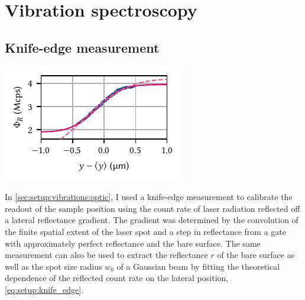 \chapter{Vibration spectroscopy}\label{ch:app:setup:vibrations}
\section{Knife-edge measurement}\label{sec:app:setup:vibrations:knife_edge}
\begin{marginfigure}
    \centering
    \includegraphics{img/pdf/setup/knife_edge_erf}
    \caption{}
    \label{fig:app:setup:vibrations:knife_edge}
\end{marginfigure}

In \cref{sec:setup:vibrations:optic}, I used a knife-edge measurement to calibrate the readout of the sample position using the count rate of laser radiation reflected off a lateral reflectance gradient.
The gradient was determined by the convolution of the finite spatial extent of the laser spot and a step in reflectance from a  gate with approximately perfect reflectance and the bare  surface.
The same measurement can also be used to extract the reflectance $r$ of the bare  surface as well as the spot size radius $w_0$ of a Gaussian beam by fitting the theoretical dependence of the reflected count rate on the lateral position, \cref{eq:setup:knife_edge}.

